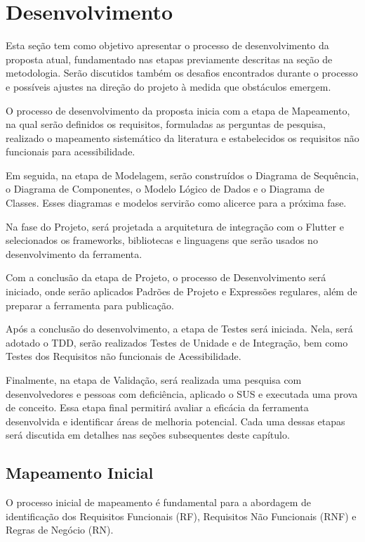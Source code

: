 \chapter{Desenvolvimento}\label{sec:desenvolvimento}

Esta seção tem como objetivo apresentar o processo de desenvolvimento da proposta atual, fundamentado nas etapas previamente descritas na seção de metodologia. Serão discutidos também os desafios encontrados durante o processo e possíveis ajustes na direção do projeto à medida que obstáculos emergem.

O processo de desenvolvimento da proposta inicia com a etapa de Mapeamento, na qual serão definidos os requisitos, formuladas as perguntas de pesquisa, realizado o mapeamento sistemático da literatura e estabelecidos os requisitos não funcionais para acessibilidade.

Em seguida, na etapa de Modelagem, serão construídos o Diagrama de Sequência, o Diagrama de Componentes, o Modelo Lógico de Dados e o Diagrama de Classes. Esses diagramas e modelos servirão como alicerce para a próxima fase.

Na fase do Projeto, será projetada a arquitetura de integração com o Flutter e selecionados os frameworks, bibliotecas e linguagens que serão usados no desenvolvimento da ferramenta.

Com a conclusão da etapa de Projeto, o processo de Desenvolvimento será iniciado, onde serão aplicados Padrões de Projeto e Expressões regulares, além de preparar a ferramenta para publicação.

Após a conclusão do desenvolvimento, a etapa de Testes será iniciada. Nela, será adotado o TDD, serão realizados Testes de Unidade e de Integração, bem como Testes dos Requisitos não funcionais de Acessibilidade.

Finalmente, na etapa de Validação, será realizada uma pesquisa com desenvolvedores e pessoas com deficiência, aplicado o SUS e executada uma prova de conceito. Essa etapa final permitirá avaliar a eficácia da ferramenta desenvolvida e identificar áreas de melhoria potencial. Cada uma dessas etapas será discutida em detalhes nas seções subsequentes deste capítulo.

\section{Mapeamento Inicial}

O processo inicial de mapeamento é fundamental para a abordagem de identificação dos Requisitos Funcionais (RF), Requisitos Não Funcionais (RNF) e Regras de Negócio (RN).

